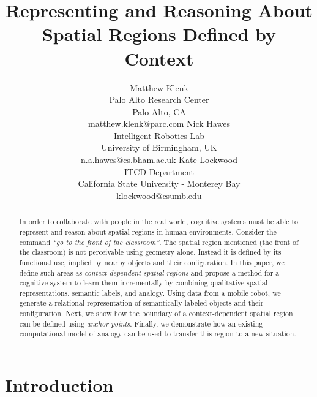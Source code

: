 \documentclass[letterpaper]{article}
\begin{document}
\title{Representing and Reasoning About Spatial Regions Defined by Context}

\author{Matthew Klenk \\ Palo Alto Research Center \\  Palo Alto, CA \\ matthew.klenk@parc.com \And Nick Hawes \\ Intelligent Robotics Lab \\ University of Birmingham, UK \\ n.a.hawes@cs.bham.ac.uk \And Kate Lockwood \\ ITCD Department \\ California State University - Monterey Bay \\ klockwood@csumb.edu  }


 \maketitle
 \begin{abstract}
In order to collaborate with people in the real world, cognitive systems must be able to represent and reason about spatial regions in human environments. Consider the command \emph{``go to the front of the classroom''}. The spatial region mentioned (the front of the classroom) is not perceivable using geometry alone. Instead it is defined by its functional use, implied by nearby objects and their configuration. In this paper, we define such areas as \textit{context-dependent spatial regions} and propose a method for a cognitive system to learn them incrementally by combining qualitative spatial representations, semantic labels, and analogy. Using data from a mobile robot, we generate a relational representation of semantically labeled objects and their configuration. Next, we show how the boundary of a context-dependent spatial region can be defined using \textit{anchor points}. Finally, we demonstrate how an existing computational model of analogy can be used to transfer this region to a new situation. 
 \end{abstract}

 \section{Introduction}
\end{document}
